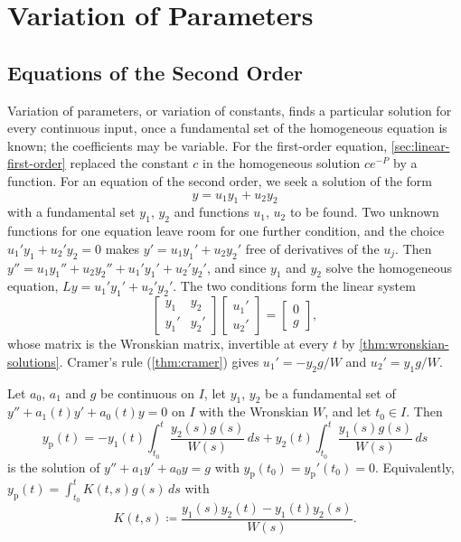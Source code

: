 \section{Variation of Parameters}
\label{sec:variation-parameters}

\subsection{Equations of the Second Order}

Variation of parameters, or variation of constants, finds a particular solution for every continuous input, once a fundamental set of the homogeneous equation is known; the coefficients may be variable. For the first-order equation, \cref{sec:linear-first-order} replaced the constant $c$ in the homogeneous solution $ce^{-P}$ by a function. For an equation of the second order, we seek a solution of the form
\[
y=u_1y_1+u_2y_2
\]
with a fundamental set $y_1$, $y_2$ and functions $u_1$, $u_2$ to be found. Two unknown functions for one equation leave room for one further condition, and the choice $u_1'y_1+u_2'y_2=0$ makes $y'=u_1y_1'+u_2y_2'$ free of derivatives of the $u_j$. Then $y''=u_1y_1''+u_2y_2''+u_1'y_1'+u_2'y_2'$, and since $y_1$ and $y_2$ solve the homogeneous equation, $Ly=u_1'y_1'+u_2'y_2'$. The two conditions form the linear system
\[
\begin{bmatrix}y_1&y_2\\y_1'&y_2'\end{bmatrix}\begin{bmatrix}u_1'\\u_2'\end{bmatrix}=\begin{bmatrix}0\\g\end{bmatrix},
\]
whose matrix is the Wronskian matrix, invertible at every $t$ by \cref{thm:wronskian-solutions}. Cramer's rule (\cref{thm:cramer}) gives $u_1'=-y_2g/W$ and $u_2'=y_1g/W$.

\begin{theorem}
\label{thm:variation-two}
Let $a_0$, $a_1$ and $g$ be continuous on $I$, let $y_1$, $y_2$ be a fundamental set of $y''+a_1(t)y'+a_0(t)y=0$ on $I$ with the Wronskian $W$, and let $t_0\in I$. Then
\begin{equation}
y_{\mathrm p}(t)=-y_1(t)\int_{t_0}^t\frac{y_2(s)g(s)}{W(s)}\,ds+y_2(t)\int_{t_0}^t\frac{y_1(s)g(s)}{W(s)}\,ds
\label{eq:variation-two}
\end{equation}
is the solution of $y''+a_1y'+a_0y=g$ with $y_{\mathrm p}(t_0)=y_{\mathrm p}'(t_0)=0$. Equivalently, $y_{\mathrm p}(t)=\int_{t_0}^tK(t,s)g(s)\,ds$ with
\[
K(t,s)\coloneqq\frac{y_1(s)y_2(t)-y_1(t)y_2(s)}{W(s)} .
\]
\end{theorem}

